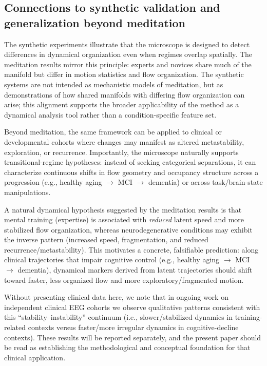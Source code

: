\documentclass[5p,twocolumn,authoryear]{elsarticle}
\begin{document}
\subsection{Connections to synthetic validation and generalization beyond meditation}
The synthetic experiments illustrate that the microscope is designed to detect differences in dynamical organization even when regimes overlap spatially. The meditation results mirror this principle: experts and novices share much of the manifold but differ in motion statistics and flow organization. The synthetic systems are not intended as mechanistic models of meditation, but as demonstrations of how shared manifolds with differing flow organization can arise; this alignment supports the broader applicability of the method as a dynamical analysis tool rather than a condition-specific feature set.

Beyond meditation, the same framework can be applied to clinical or developmental cohorts where changes may manifest as altered metastability, exploration, or recurrence. Importantly, the microscope naturally supports transitional-regime hypotheses: instead of seeking categorical separations, it can characterize continuous shifts in flow geometry and occupancy structure across a progression (e.g., healthy aging $\rightarrow$ MCI $\rightarrow$ dementia) or across task/brain-state manipulations.


A natural dynamical hypothesis suggested by the meditation results is that mental training (expertise) is associated with \emph{reduced} latent speed and more stabilized flow organization, whereas neurodegenerative conditions may exhibit the inverse pattern (increased speed, fragmentation, and reduced recurrence/metastability). This motivates a concrete, falsifiable prediction: along clinical trajectories that impair cognitive control (e.g., healthy aging $\rightarrow$ MCI $\rightarrow$ dementia), dynamical markers derived from latent trajectories should shift toward faster, less organized flow and more exploratory/fragmented motion.

Without presenting clinical data here, we note that in ongoing work on independent clinical EEG cohorts we observe qualitative patterns consistent with this ``stability--instability'' continuum (i.e., slower/stabilized dynamics in training-related contexts versus faster/more irregular dynamics in cognitive-decline contexts). These results will be reported separately, and the present paper should be read as establishing the methodological and conceptual foundation for that clinical application.
\end{document}

